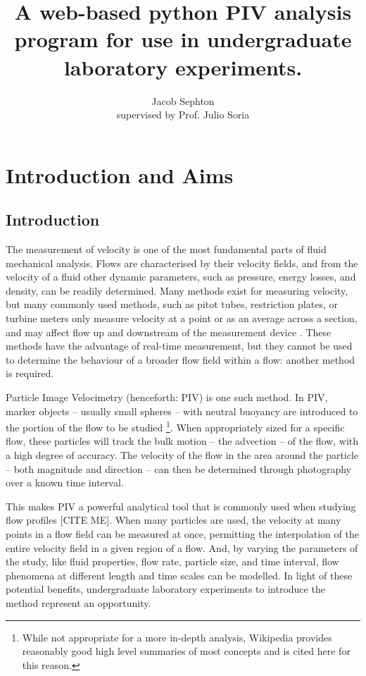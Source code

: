\documentclass[12pt, a4paper]{amsart}
\title{A web-based python PIV analysis program for use in undergraduate laboratory experiments.}
\author{Jacob Sephton\\ supervised by Prof. Julio Soria}
\begin{document}
\maketitle

\section{Introduction and Aims}
\subsection{Introduction}
The measurement of velocity is one of the most fundamental parts of fluid mechanical analysis. Flows are characterised by their velocity fields, and from the velocity of a fluid other dynamic parameters, such as pressure, energy losses, and density, can be readily determined. Many methods exist for measuring velocity, but many commonly used methods, such as pitot tubes, restriction plates, or turbine meters only measure velocity at a point or as an average across a section, and may affect flow up and downstream of the measurement device \cite[pp. 109, 469]{munson}. These methods have the advantage of real-time measurement, but they cannot be used to determine the behaviour of a broader flow field within a flow: another method is required. 

Particle Image Velocimetry (henceforth: PIV) is one such method. In PIV, marker objects -- usually small spheres -- with neutral buoyancy are introduced to the portion of the flow to be studied \cite{wikipiv}\footnote{While not appropriate for a more in-depth analysis, Wikipedia provides reasonably good high level summaries of most concepts and is cited here for this reason.}. When appropriately sized for a specific flow, these particles will track the bulk motion -- the advection -- of the flow, with a high degree of accuracy. The velocity of the flow in the area around the particle -- both magnitude and direction -- can then be determined through photography over a known time interval. 

This makes PIV a powerful analytical tool that is commonly used when studying flow profiles [CITE ME]. When many particles are used, the velocity at many points in a flow field can be measured at once, permitting the interpolation of the entire velocity field in a given region of a flow. And, by varying the parameters of the study, like fluid properties, flow rate, particle size, and time interval, flow phenomena at different length and time scales can be modelled. In light of these potential benefits, undergraduate laboratory experiments to introduce the method represent an opportunity.
\end{document}
